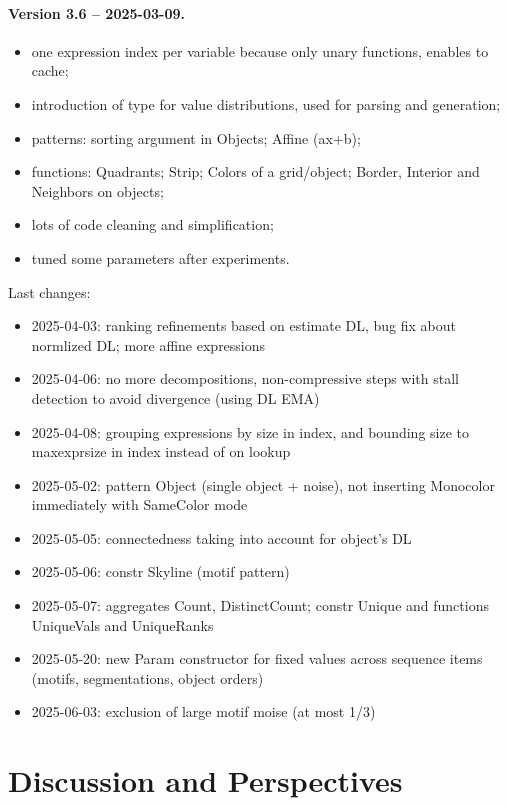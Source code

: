 \documentclass[a4paper]{llncs}
\begin{document}
\paragraph{Version 3.6 -- 2025-03-09.}
\begin{itemize}
\item one expression index per variable because only unary functions, enables to cache;
\item introduction of type for value distributions, used for parsing and generation;
\item patterns: sorting argument in Objects; Affine (ax+b); 
\item functions: Quadrants; Strip; Colors of a grid/object; Border, Interior and Neighbors on objects;
\item lots of code cleaning and simplification;
\item tuned some parameters after experiments.
\end{itemize}

Last changes:
\begin{itemize}
\item 2025-04-03: ranking refinements based on estimate DL, bug fix about normlized DL; more affine expressions
\item 2025-04-06: no more decompositions, non-compressive steps with stall detection to avoid divergence (using DL EMA)
\item 2025-04-08: grouping expressions by size in index, and bounding size to maxexprsize in index instead of on lookup
\item 2025-05-02: pattern Object (single object + noise), not inserting Monocolor immediately with SameColor mode
\item 2025-05-05: connectedness taking into account for object's DL
\item 2025-05-06: constr Skyline (motif pattern)
\item 2025-05-07: aggregates Count, DistinctCount; constr Unique and functions UniqueVals and UniqueRanks
\item 2025-05-20: new Param constructor for fixed values across sequence items (motifs, segmentations, object orders)
\item 2025-06-03: exclusion of large motif moise (at most 1/3)
\end{itemize}

\section{Discussion and Perspectives}
\label{conclu}
\end{document}
